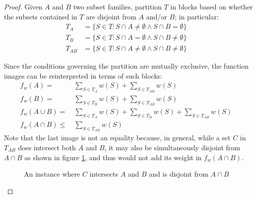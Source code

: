 \begin{proof} 
    Given $A$ and $B$ two subset families, partition $T$ in blocks based on whether the subsets contained in $T$ are disjoint from $A$ and/or $B$; in particular: 
    \begin{align*}
        T_A     &= \{S \in T : S \cap A \neq \emptyset \wedge S \cap B = \emptyset\} & \\
        T_B     &= \{S \in T : S \cap A = \emptyset \wedge S \cap B \neq \emptyset\} & \\
        T_{AB}  &= \{S \in T : S \cap A \neq \emptyset \wedge S \cap B \neq \emptyset\} &
    \end{align*}
    
    Since the conditions governing the partition are mutually exclusive, the function images can be reinterpreted in terms of such blocks:
    \begin{align*}
        f_w(A)             =&\ \sum_{S \in T_A} w(S) + \sum_{S \in T_{AB}} w(S)                         & \\
        f_w(B)             =&\ \sum_{S \in T_B} w(S) + \sum_{S \in T_{AB}} w(S)                         & \\
        f_w(A \cup B)      =&\ \sum_{S \in T_A} w(S) + \sum_{S \in T_B} w(S) + \sum_{S \in T_{AB}} w(S) & \\
        f_w(A \cap B)   \leq&\ \sum_{S \in T_{AB}} w(S)                                                 &
    \end{align*}
    Note that the last image is not an equality because, in general, while a set $C$ in $T_{AB}$ does intersect both $A$ and $B$, it may also be simultaneously disjoint from $A \cap B$ as shown in figure \ref{fig:sets-intersect-empty}, and thus would not add its weight in $f_w(A \cap B)$.

    \begin{figure}[ht]
        \centering
        \caption{An instance where $C$ intersects $A$ and $B$ and is disjoint from $A \cap B$}
        \label{fig:sets-intersect-empty}
    \end{figure}
    

\end{proof}
